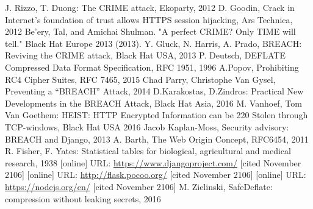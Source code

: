 \documentclass[a4paper, 11 pt, conference]{article}  %
\begin{document}
\begin{thebibliography}{13}

 J. Rizzo, T. Duong: The CRIME attack, Ekoparty, 2012
 D. Goodin, Crack in Internet’s foundation of trust allows HTTPS session hijacking, Ars Technica, 2012
 Be’ery, Tal, and Amichai Shulman. "A perfect CRIME? Only TIME will
tell." Black Hat Europe 2013 (2013).
 Y. Gluck, N. Harris, A. Prado, BREACH: Reviving the CRIME attack, Black Hat USA, 2013
 P. Deutsch, DEFLATE Compressed Data Format Specification, RFC 1951, 1996
 A.Popov, Prohibiting RC4 Cipher Suites, RFC 7465, 2015
 Chad Parry, Christophe Van Gysel, Preventing a “BREACH” Attack, 2014
 D.Karakostas, D.Zindros: Practical New Developments in the BREACH Attack, Black Hat Asia, 2016
 M. Vanhoef, Tom Van Goethem: HEIST: HTTP Encrypted Information can be 220 Stolen through TCP-windows, Black Hat USA 2016
 Jacob Kaplan-Moss, Security advisory: BREACH and Django, 2013
 A. Barth, The Web Origin Concept, RFC6454, 2011
 R. Fisher, F. Yates: Statistical tables for biological,
agricultural and medical research, 1938
 [online] URL: \url{https://www.djangoproject.com/} [cited November 2106]
 [online] URL: \url{http://flask.pocoo.org/} [cited November 2106]
 [online] URL: \url{https://nodejs.org/en/} [cited November 2106]
 M. Zielinski, SafeDeflate: compression without leaking secrets,
2016

\end{thebibliography}
\end{document}
